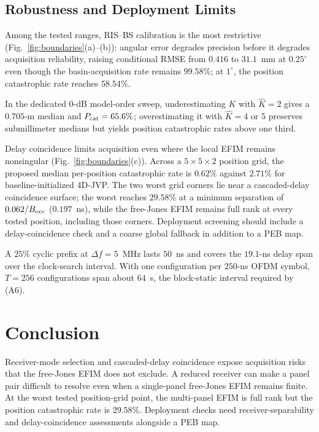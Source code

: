 \documentclass[letterpaper,journal]{IEEEtran}
\begin{document}
\subsection{Robustness and Deployment Limits}
\label{subsec:res_robustness}
Among the tested ranges, RIS--BS calibration
is the most restrictive (Fig.~\ref{fig:boundaries}(a)--(b)): angular error
degrades precision before it degrades acquisition reliability, raising
conditional RMSE from $0.416$
to $31.1$~mm at $0.25^\circ$ even though the basin-acquisition rate remains
$99.58\%$; at $1^\circ$, the position catastrophic rate reaches $58.54\%$.

In the dedicated $0$-dB model-order sweep, underestimating $K$ with
$\widehat K=2$ gives a $0.705$-m median and
$P_{\rm cat}=65.6\%$; overestimating it with $\widehat K=4$ or $5$ preserves
submillimeter medians but yields position catastrophic rates above one third.

Delay coincidence limits acquisition even where the local EFIM remains
nonsingular (Fig.~\ref{fig:boundaries}(c)). Across a $5\times5\times2$
position grid, the proposed median per-position catastrophic rate is $0.62\%$
against $2.71\%$ for baseline-initialized 4D-JVP\@. The two worst grid corners
lie near a cascaded-delay coincidence surface; the worst reaches $29.58\%$ at
a minimum separation of $0.062/B_{\rm occ}$ ($0.197$~ns), while the free-Jones
EFIM remains full rank at every tested position, including those corners.
Deployment screening should include a delay-coincidence check and a coarse
global fallback in addition to a PEB map.

A $25\%$ cyclic prefix at $\Delta f=5$~MHz lasts $50$~ns and covers the $19.1$-ns delay span
over the clock-search interval. With one configuration per $250$-ns OFDM
symbol, $T=256$ configurations span about $64$~\textmu s, the block-static interval
required by (A6).
\section{Conclusion}
\label{sec:conclusion}

Receiver-mode selection and cascaded-delay coincidence expose acquisition
risks that the free-Jones EFIM does not exclude. A reduced receiver can make
a panel pair difficult to resolve even when a single-panel free-Jones EFIM remains
finite. At the worst tested position-grid point, the multi-panel EFIM is full
rank but the position catastrophic rate is $29.58\%$. Deployment checks
need receiver-separability and delay-coincidence assessments alongside a PEB
map.
\end{document}
